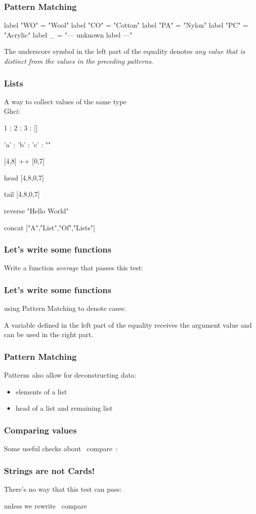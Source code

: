 \documentclass[11pt,xcolor={dvipsnames}]{beamer}
\newcommand{\tc}{\textcolor}
\newcommand{\key}[1]{\tc{orange}{#1}}
\newcommand{\rk}{\enskip{\key{$\hookleftarrow$}}}
\newcommand{\vs}{\vspace{1em}}
\newcommand{\lstH}[1]{}
\newcommand{\lstT}[1]{}
\begin{document}
\begin{frame}[fragile]
\frametitle{Pattern Matching}
\begin{haskell}
label "WO" = "Wool"
label "CO" = "Cotton"
label "PA" = "Nylon"
label "PC" = "Acrylic"
label   _  = "--- unknown label ---"
\end{haskell}
The underscore symbol in the left part of the equality denotes \emph{any value that is distinct from the values in the preceding patterns}.
\end{frame}
\begin{frame}[fragile]
\frametitle{Lists}
A way to collect values of the same type\\
Ghci:
\begin{term}
1 : 2 : 3 : []\rk

'a' : 'b' : 'c' : ""\rk

[4,8] ++ [0,7]\rk

head [4,8,0,7]\rk

tail [4,8,0,7]\rk

reverse "Hello World"\rk

concat ["A","List","Of","Lists"]\rk
\end{term}
\end{frame}
\begin{frame}[fragile]
\frametitle{Let's write some functions}
Write a function \emph{average} that passes this test:
\vs
\lstT{012}
\end{frame}
\begin{frame}[fragile]
\frametitle{Let's write some functions}
using Pattern Matching to denote cases: 
\vs
\lstH{013}
\vs
A variable defined in the left part of the equality receives the argument value and can be used in the right part.
\end{frame}
\begin{frame}[fragile]
\frametitle{Pattern Matching}
\lstH{014}
\vs
Patterns also allow for deconstructing data:
\begin{itemize}
\item elements of a list
\item head of a list and remaining list 
\end{itemize}
\end{frame}
\begin{frame}[fragile]
\frametitle{Comparing values}
Some useful checks about ~compare~:
\vs
\lstT{015}
\end{frame}
\begin{frame}[fragile]
\frametitle{Strings are not Cards!}
There's no way that this test can pass:
\vs
\lstT{016}
\vs
unless we rewrite ~compare~ 
\end{frame}
\end{document}
